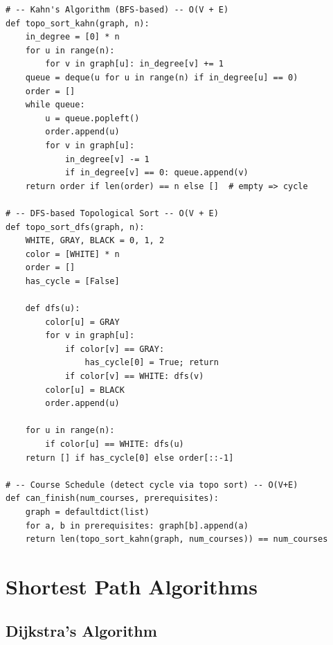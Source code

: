 \documentclass[11pt,a4paper]{report}
\begin{document}
\begin{lstlisting}
# -- Kahn's Algorithm (BFS-based) -- O(V + E)
def topo_sort_kahn(graph, n):
    in_degree = [0] * n
    for u in range(n):
        for v in graph[u]: in_degree[v] += 1
    queue = deque(u for u in range(n) if in_degree[u] == 0)
    order = []
    while queue:
        u = queue.popleft()
        order.append(u)
        for v in graph[u]:
            in_degree[v] -= 1
            if in_degree[v] == 0: queue.append(v)
    return order if len(order) == n else []  # empty => cycle

# -- DFS-based Topological Sort -- O(V + E)
def topo_sort_dfs(graph, n):
    WHITE, GRAY, BLACK = 0, 1, 2
    color = [WHITE] * n
    order = []
    has_cycle = [False]

    def dfs(u):
        color[u] = GRAY
        for v in graph[u]:
            if color[v] == GRAY:
                has_cycle[0] = True; return
            if color[v] == WHITE: dfs(v)
        color[u] = BLACK
        order.append(u)

    for u in range(n):
        if color[u] == WHITE: dfs(u)
    return [] if has_cycle[0] else order[::-1]

# -- Course Schedule (detect cycle via topo sort) -- O(V+E)
def can_finish(num_courses, prerequisites):
    graph = defaultdict(list)
    for a, b in prerequisites: graph[b].append(a)
    return len(topo_sort_kahn(graph, num_courses)) == num_courses
\end{lstlisting}

\chapter{Shortest Path Algorithms}

\section{Dijkstra's Algorithm}
\end{document}
